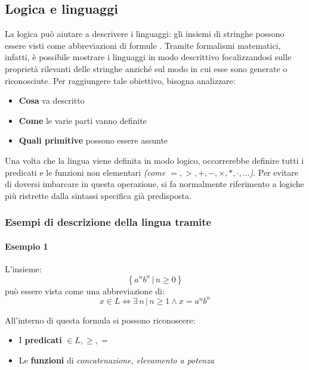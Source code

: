 \documentclass[italian, 10pt]{article}
\begin{document}
\subsection{Logica e linguaggi}
\label{sec:logica-linguaggi}

La logica può aiutare a descrivere i linguaggi: gli insiemi di stringhe possono essere visti come abbreviazioni di formule \FOL.
Tramite formalismi matematici, infatti, è possibile mostrare i linguaggi in modo descrittivo focalizzandosi sulle proprietà rilevanti delle stringhe anziché sul modo in cui esse sono generate o riconosciute.
Per raggiungere tale obiettivo, bisogna analizzare:

\begin{itemize}
  \item \textbf{Cosa} va descritto
  \item \textbf{Come} le varie parti vanno definite
  \item \textbf{Quali primitive} possono essere assunte
\end{itemize}

\bigskip
Una volta che la lingua viene definita in modo logico, occorrerebbe definire tutti i predicati e le funzioni non elementari \textit{(come \(=, >, +, -, \times, \ast, \cdot, \ldots\))}.
Per evitare di doversi imbarcare in questa operazione, si fa normalmente riferimento a logiche più ristrette dalla sintassi specifica già predisposta.

\subsubsection{Esempi di descrizione della lingua tramite \FOL}

\paragraph{Esempio 1}
\label{par:esempio-fol-1}

L'insieme:
\[ \left\{ a^n b^n \, | \, n \geq 0 \right\} \]
può essere vista come una abbreviazione di:
\[ x \in L \Leftrightarrow \exists \, n \, | \, n \geq 1 \land x = a^n b^n \]

All'interno di questa formula si possono riconoscere:

\begin{itemize}
  \item I \textbf{predicati} \(\in L, \geq, =\)
  \item Le \textbf{funzioni} di \textit{concatenazione, elevamento a potenza}
\end{itemize}
\end{document}
